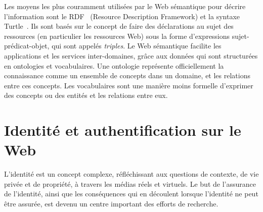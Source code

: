 \documentclass[a4paper]{article}
\begin{document}
Les moyens les plus couramment utilisées par le Web sémantique pour décrire l'information sont le RDF~\cite{klyne2004resource} (Resource Description Framework) et la syntaxe Turtle~\cite{beckett2008turtle}. Ils sont basés sur le concept de faire des déclarations au sujet des ressources (en particulier les ressources Web) sous la forme d'expressions sujet-prédicat-objet, qui sont appelés \textit{triples}. Le Web sémantique facilite les applications et les services inter-domaines, grâce aux données qui sont structurées en ontologies et vocabulaires. Une ontologie représente officiellement la connaissance comme un ensemble de concepts dans un domaine, et les relations entre ces concepts. Les vocabulaires sont une manière moins formelle d'exprimer des concepts ou des entités et les relations entre eux.

\section{Identité et authentification sur le Web}
\label{ch:identity}
L'identité est un concept complexe, réfléchissant aux questions de contexte, de vie privée et de propriété, à travers les médias réels et virtuels. Le but de l'assurance de l'identité, ainsi que les conséquences qui en découlent lorsque l'identité ne peut être assurée, est devenu un centre important des efforts de recherche.\\
\end{document}
